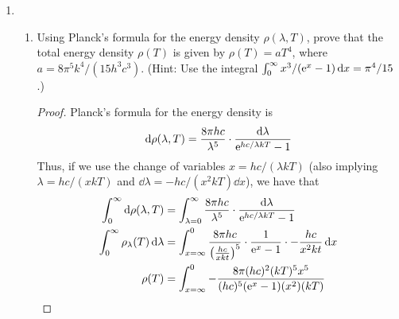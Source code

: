 \documentclass[../psets.tex]{subfiles}
\begin{document}
\begin{enumerate}
\begin{enumerate}
        \item Secondly, compute the wavelength at which the emissive power at the sun's surface has its maximum. In which region of the radiation spectrum does this wavelength lie, i.e., infrared (IR), visible, or ultraviolet (UV)?
        \begin{proof}[Answer]
            If $b=\SI{2.898e-3}{\meter\kelvin}$ is Wien's displacement constant and we plug in the temperature value $T$ from part (a), then Wien's first law gives us
            \begin{align*}
                \lambda_\text{max}T &= b\\
                \lambda_\text{max} &= \frac{b}{T}\\
                \Aboxed{\lambda_\text{max} &= \SI{4.99e-7}{\meter}}
            \end{align*}
            This wavelength lies in the  spectrum.
        \end{proof}
    \end{enumerate}
    \item 
    \begin{enumerate}
        \item Using Planck's formula for the energy density $\rho(\lambda,T)$, prove that the total energy density $\rho(T)$ is given by $\rho(T)=aT^4$, where $a=8\pi^5k^4/(15h^3c^3)$. (Hint: Use the integral $\int_0^\infty x^3/(\e[x]-1)\dd{x}=\pi^4/15$.)
        \begin{proof}
            Planck's formula for the energy density is
            \begin{equation*}
                \dd{\rho(\lambda,T)} = \frac{8\pi hc}{\lambda^5}\cdot\frac{\dd{\lambda}}{\e[hc/\lambda kT]-1}
            \end{equation*}
            Thus, if we use the change of variables $x=hc/(\lambda kT)$ (also implying $\lambda=hc/(xkT)$ and $\dd{\lambda}=-hc/(x^2kT)\dd{x}$), we have that
            \begin{align*}
                \int_0^\infty\dd{\rho(\lambda,T)} &= \int_{\lambda=0}^\infty\frac{8\pi hc}{\lambda^5}\cdot\frac{\dd{\lambda}}{\e[hc/\lambda kT]-1}\\
                \int_0^\infty\rho_\lambda(T)\dd{\lambda} &= \int_{x=\infty}^0\frac{8\pi hc}{\left( \frac{hc}{xkt} \right)^5}\cdot\frac{1}{\e[x]-1}\cdot-\frac{hc}{x^2kt}\dd{x}\\
                \rho(T) &= \int_{x=\infty}^0-\frac{8\pi(hc)^2(kT)^5x^5}{(hc)^5(\e[x]-1)(x^2)(kT)}\\

\end{align*}
\end{proof}
\end{enumerate}
\end{enumerate}
\end{document}
